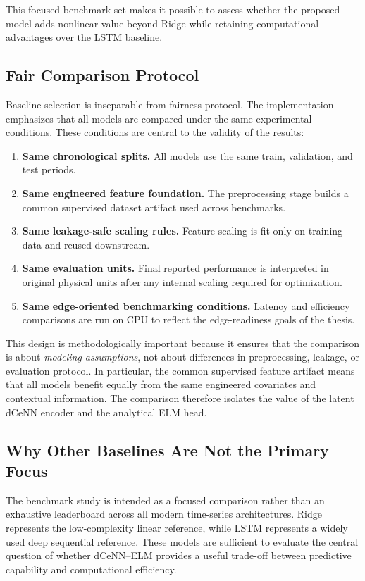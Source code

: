 This focused benchmark set makes it possible to assess whether the proposed model adds nonlinear value beyond Ridge while retaining computational advantages over the LSTM baseline.

\subsection{Fair Comparison Protocol}

Baseline selection is inseparable from fairness protocol. The implementation emphasizes that all models are compared under the same experimental conditions. These conditions are central to the validity of the results:
\begin{enumerate}
	\item \textbf{Same chronological splits.} All models use the same train, validation, and test periods.
	\item \textbf{Same engineered feature foundation.} The preprocessing stage builds a common supervised dataset artifact used across benchmarks.
	\item \textbf{Same leakage-safe scaling rules.} Feature scaling is fit only on training data and reused downstream.
	\item \textbf{Same evaluation units.} Final reported performance is interpreted in original physical units after any internal scaling required for optimization.
	\item \textbf{Same edge-oriented benchmarking conditions.} Latency and efficiency comparisons are run on CPU to reflect the edge-readiness goals of the thesis.
\end{enumerate}

This design is methodologically important because it ensures that the comparison is about \emph{modeling assumptions}, not about differences in preprocessing, leakage, or evaluation protocol. In particular, the common supervised feature artifact means that all models benefit equally from the same engineered covariates and contextual information. The comparison therefore isolates the value of the latent dCeNN encoder and the analytical ELM head.

\subsection{Why Other Baselines Are Not the Primary Focus}

The benchmark study is intended as a focused comparison rather than an exhaustive leaderboard across all modern time-series architectures. Ridge represents the low-complexity linear reference, while LSTM represents a widely used deep sequential reference. These models are sufficient to evaluate the central question of whether dCeNN--ELM provides a useful trade-off between predictive capability and computational efficiency.

